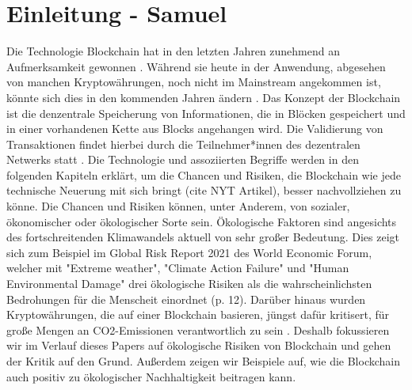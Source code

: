 \chapter{Einleitung - Samuel}
Die Technologie Blockchain hat in den letzten Jahren zunehmend an Aufmerksamkeit gewonnen \cite{Google_google_2021}. Während sie heute in der Anwendung, abgesehen von manchen Kryptowährungen, noch nicht im Mainstream angekommen ist, könnte sich dies in den kommenden Jahren ändern \cite{ovide_what_2021}. Das Konzept der Blockchain ist die denzentrale Speicherung von Informationen, die in Blöcken gespeichert und in einer vorhandenen Kette aus Blocks angehangen wird. Die Validierung von Transaktionen findet hierbei durch die Teilnehmer*innen des dezentralen Netwerks statt \cite{shermin_blockchain_2019}. Die Technologie und assoziierten Begriffe werden in den folgenden Kapiteln erklärt, um die Chancen und Risiken, die Blockchain wie jede technische Neuerung mit sich bringt (cite NYT Artikel), besser nachvollziehen zu könne. \newline
Die Chancen und Risiken können, unter Anderem, von sozialer, ökonomischer oder ökologischer Sorte sein. Ökologische Faktoren sind angesichts des fortschreitenden Klimawandels aktuell von sehr großer Bedeutung. Dies zeigt sich zum Beispiel im Global Risk Report 2021 des World Economic Forum, welcher mit "Extreme weather", "Climate Action Failure" und "Human Environmental Damage" drei ökologische Risiken als die wahrscheinlichsten Bedrohungen für die Menscheit einordnet \cite{WEF_global_2021}(p. 12). Darüber hinaus wurden Kryptowährungen, die auf einer Blockchain basieren, jüngst dafür kritisert, für große Mengen an CO2-Emissionen verantwortlich zu sein \cite{waters_musk_2021}. Deshalb fokussieren wir im Verlauf dieses Papers auf ökologische Risiken von Blockchain und gehen der Kritik auf den Grund. Außerdem zeigen wir Beispiele auf, wie die Blockchain auch positiv zu ökologischer Nachhaltigkeit beitragen kann. 











